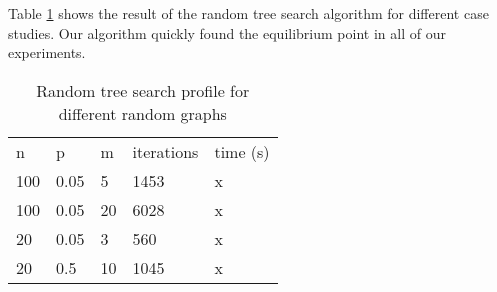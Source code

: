Table \ref{tab:result1} shows the result of the random tree search algorithm for different case studies. Our algorithm quickly found the equilibrium point in all of our experiments.

\begin{table}[]
\centering
\caption{Random tree search profile for different random graphs}
\label{tab:result1}
\begin{tabular}{lllll}
n   & p    & m  & iterations & time (s) \\
100 & 0.05 & 5  & 1453       & x        \\
100 & 0.05 & 20 & 6028       & x        \\
20  & 0.05 & 3  & 560        & x        \\
20  & 0.5  & 10 & 1045       & x
\end{tabular}
\end{table}
